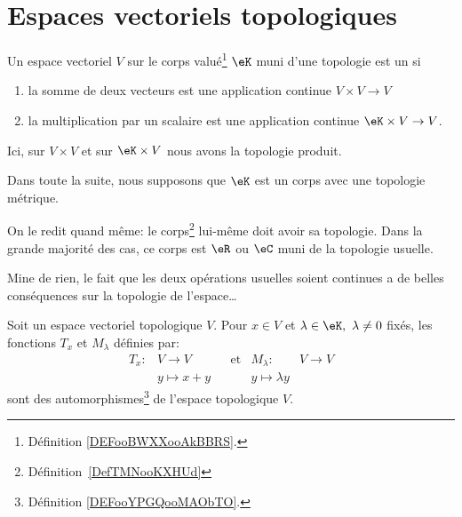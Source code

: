 
\section{Espaces vectoriels topologiques}

\begin{definition}\label{DefEVTopologique}
	Un espace vectoriel \( V\) sur le corps valué\footnote{Définition \ref{DEFooBWXXooAkBBRS}.} \( \eK\) muni d'une topologie est un  si
	\begin{enumerate}
		\item
		      la somme de deux vecteurs est une application continue \( V\times V\to V \)
		\item
		      la multiplication par un scalaire est une application continue \( \eK\times V\to V\).
	\end{enumerate}
	Ici, sur \( V\times V\) et sur \( \eK\times V\) nous avons la topologie produit.

	Dans toute la suite, nous supposons que \( \eK\) est un corps avec une topologie métrique.
\end{definition}
On le redit quand même: le corps\footnote{Définition~\ref{DefTMNooKXHUd}} lui-même doit avoir sa topologie. Dans la grande majorité des cas, ce corps est \( \eR\) ou \( \eC\) muni de la topologie usuelle.

Mine de rien, le fait que les deux opérations usuelles soient continues a de belles conséquences sur la topologie de l'espace\dots

\begin{proposition}      \label{PROPooDXLFooFghbWk}
	Soit un espace vectoriel topologique \( V\). Pour \(x \in V \) et \(\lambda \in \eK, \ \lambda \neq 0 \) fixés, les fonctions \( T_x \) et \( M_\lambda \) définies par:
	\begin{align}
		T_x: & V \to V       &  & \text{et} & M_\lambda:          & V \to V \\
		     & y \mapsto x+y &  &           & y \mapsto \lambda y
	\end{align}
	sont des automorphismes\footnote{Définition \ref{DEFooYPGQooMAObTO}.} de l'espace topologique \(V \).
\end{proposition}

